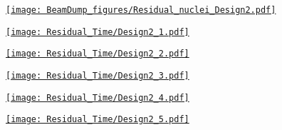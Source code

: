 \documentclass[xcolor={dvipsnames}]{beamer}
\begin{document}
\begin{frame}[plain]
 \hypertarget{Residual_nuclei_Design2}{\hyperlink{residualtimesprev_Design2}{\texttt{[image: BeamDump\_figures/Residual\_nuclei\_Design2.pdf]}}}
\end{frame}
\begin{frame}[plain]
 \hypertarget{Residual_nuclei_minute_Design2}{\hyperlink{residualtimesprev_Design2}{\texttt{[image: Residual\_Time/Design2\_1.pdf]}}}
\end{frame}
\begin{frame}[plain]
 \hypertarget{Residual_nuclei_hour_Design2}{\hyperlink{residualtimesprev_Design2}{\texttt{[image: Residual\_Time/Design2\_2.pdf]}}}
\end{frame}
\begin{frame}[plain]
 \hypertarget{Residual_nuclei_day_Design2}{\hyperlink{residualtimesprev_Design2}{\texttt{[image: Residual\_Time/Design2\_3.pdf]}}}
\end{frame}
\begin{frame}[plain]
 \hypertarget{Residual_nuclei_month_Design2}{\hyperlink{residualtimesprev_Design2}{\texttt{[image: Residual\_Time/Design2\_4.pdf]}}}
\end{frame}
\begin{frame}[plain]
 \hypertarget{Residual_nuclei_year_Design2}{\hyperlink{residualtimesprev_Design2}{\texttt{[image: Residual\_Time/Design2\_5.pdf]}}}
\end{frame}
\end{document}
